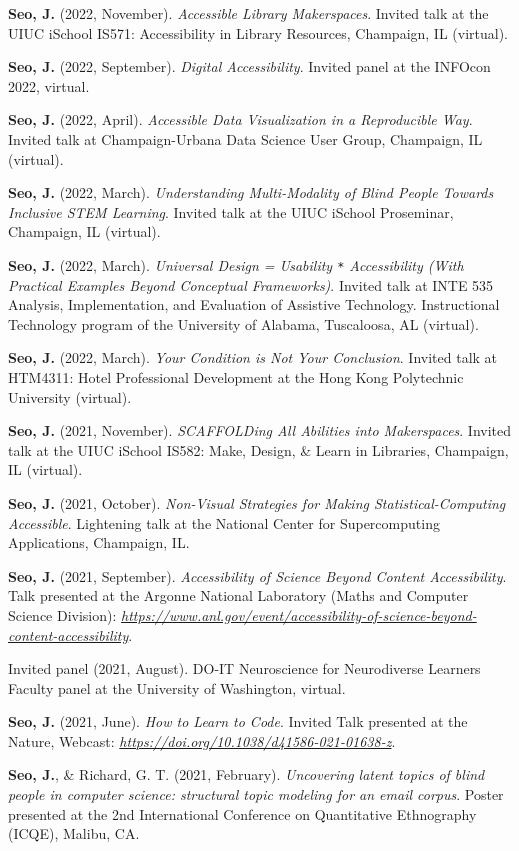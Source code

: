 \documentclass[11pt,a4paper,]{awesome-cv}
\begin{document}
\textbf{Seo, J.} (2022, November). \emph{Accessible Library
Makerspaces}. Invited talk at the UIUC iSchool IS571: Accessibility in
Library Resources, Champaign, IL (virtual).

\textbf{Seo, J.} (2022, September). \emph{Digital Accessibility}.
Invited panel at the INFOcon 2022, virtual.

\textbf{Seo, J.} (2022, April). \emph{Accessible Data Visualization in a
Reproducible Way}. Invited talk at Champaign-Urbana Data Science User
Group, Champaign, IL (virtual).

\textbf{Seo, J.} (2022, March). \emph{Understanding Multi-Modality of
Blind People Towards Inclusive STEM Learning}. Invited talk at the UIUC
iSchool Proseminar, Champaign, IL (virtual).

\textbf{Seo, J.} (2022, March). \emph{Universal Design = Usability
\texttt{*} Accessibility (With Practical Examples Beyond Conceptual
Frameworks)}. Invited talk at INTE 535 Analysis, Implementation, and
Evaluation of Assistive Technology. Instructional Technology program of
the University of Alabama, Tuscaloosa, AL (virtual).

\textbf{Seo, J.} (2022, March). \emph{Your Condition is Not Your
Conclusion}. Invited talk at HTM4311: Hotel Professional Development at
the Hong Kong Polytechnic University (virtual).

\textbf{Seo, J.} (2021, November). \emph{SCAFFOLDing All Abilities into
Makerspaces}. Invited talk at the UIUC iSchool IS582: Make, Design, \&
Learn in Libraries, Champaign, IL (virtual).

\textbf{Seo, J.} (2021, October). \emph{Non-Visual Strategies for Making
Statistical-Computing Accessible}. Lightening talk at the National
Center for Supercomputing Applications, Champaign, IL.

\textbf{Seo, J.} (2021, September). \emph{Accessibility of Science
Beyond Content Accessibility}. Talk presented at the Argonne National
Laboratory (Maths and Computer Science Division):
\emph{\url{https://www.anl.gov/event/accessibility-of-science-beyond-content-accessibility}}.

Invited panel (2021, August). DO-IT Neuroscience for Neurodiverse
Learners Faculty panel at the University of Washington, virtual.

\textbf{Seo, J.} (2021, June). \emph{How to Learn to Code}. Invited Talk
presented at the Nature, Webcast:
\emph{\url{https://doi.org/10.1038/d41586-021-01638-z}}.

\textbf{Seo, J.}, \& Richard, G. T. (2021, February). \emph{Uncovering
latent topics of blind people in computer science: structural topic
modeling for an email corpus}. Poster presented at the 2nd International
Conference on Quantitative Ethnography (ICQE), Malibu, CA.
\end{document}
